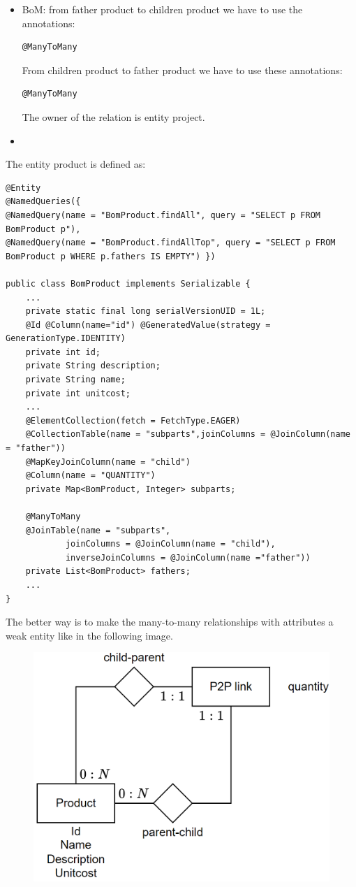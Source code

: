 \begin{itemize}
    \item BoM: from father product to children product we have to use the annotations: 
        \begin{lstlisting}[style=Java]
@ManyToMany
        \end{lstlisting}
        From children product to father product we have to use these annotations: 
        \begin{lstlisting}[style=Java]
@ManyToMany
        \end{lstlisting}
        The owner of the relation is entity project. 
    \item 
\end{itemize}
The entity product is defined as:  
    \begin{lstlisting}[style=Java]
@Entity
@NamedQueries({
@NamedQuery(name = "BomProduct.findAll", query = "SELECT p FROM BomProduct p"),
@NamedQuery(name = "BomProduct.findAllTop", query = "SELECT p FROM BomProduct p WHERE p.fathers IS EMPTY") })

public class BomProduct implements Serializable {
    ...
    private static final long serialVersionUID = 1L;
    @Id @Column(name="id") @GeneratedValue(strategy = GenerationType.IDENTITY)
    private int id;
    private String description;
    private String name;
    private int unitcost;
    ...
    @ElementCollection(fetch = FetchType.EAGER)
    @CollectionTable(name = "subparts",joinColumns = @JoinColumn(name = "father"))
    @MapKeyJoinColumn(name = "child")
    @Column(name = "QUANTITY")
    private Map<BomProduct, Integer> subparts;

    @ManyToMany
    @JoinTable(name = "subparts",
            joinColumns = @JoinColumn(name = "child"),
            inverseJoinColumns = @JoinColumn(name ="father"))
    private List<BomProduct> fathers;
    ...            
}
    \end{lstlisting}
The better way is to make the many-to-many relationships with attributes a weak entity like in the following image. 
\begin{figure}[H]
    \centering
    \includegraphics[width=0.5\linewidth]{images/BoMweak.png}
\end{figure}
